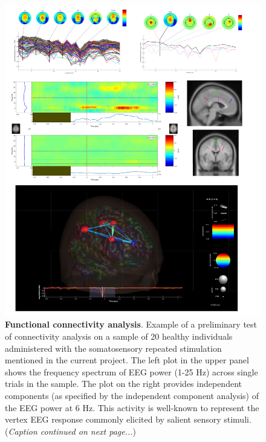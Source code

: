 \documentclass[twocolumn, serif, rga, numeric]{jote-article}
\begin{document}
\begin{figure}
  \includegraphics{./media/fig2.png}
  \caption{\textbf{Functional connectivity analysis}. Example of a preliminary test of connectivity analysis on a sample of 20 healthy individuals administered with the somatosensory repeated stimulation mentioned in the current project. The left plot in the upper panel shows the frequency spectrum of EEG power (1-25 Hz) across single trials in the sample. The plot on the right provides independent components (as specified by the independent component analysis) of the EEG power at 6 Hz. This activity is well-known to represent the vertex EEG response commonly elicited by salient sensory stimuli. \\ (\textit{Caption continued on next page...})}

  \end{figure}
\end{document}
